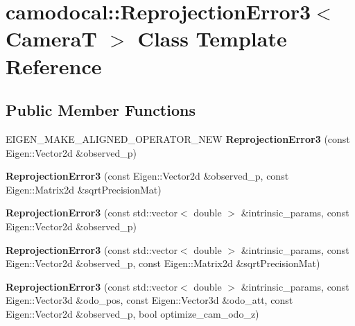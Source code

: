 \hypertarget{classcamodocal_1_1ReprojectionError3}{}\section{camodocal\+:\+:Reprojection\+Error3$<$ CameraT $>$ Class Template Reference}
\label{classcamodocal_1_1ReprojectionError3}
\subsection*{Public Member Functions}
\begin{DoxyCompactItemize}
\item 
\mbox{\label{classcamodocal_1_1ReprojectionError3_aa5f0d2d2552de6d15fa8464f7b82504e}} 
E\+I\+G\+E\+N\+\_\+\+M\+A\+K\+E\+\_\+\+A\+L\+I\+G\+N\+E\+D\+\_\+\+O\+P\+E\+R\+A\+T\+O\+R\+\_\+\+N\+EW {\bfseries Reprojection\+Error3} (const Eigen\+::\+Vector2d \&observed\+\_\+p)
\item 
\mbox{\label{classcamodocal_1_1ReprojectionError3_a6a6cfba224d6ffe08eb9c0e10a98b9b7}} 
{\bfseries Reprojection\+Error3} (const Eigen\+::\+Vector2d \&observed\+\_\+p, const Eigen\+::\+Matrix2d \&sqrt\+Precision\+Mat)
\item 
\mbox{\label{classcamodocal_1_1ReprojectionError3_ab1d8c265911e32f3625ba66edee9fe7b}} 
{\bfseries Reprojection\+Error3} (const std\+::vector$<$ double $>$ \&intrinsic\+\_\+params, const Eigen\+::\+Vector2d \&observed\+\_\+p)
\item 
\mbox{\label{classcamodocal_1_1ReprojectionError3_ad193918239d0167d9754d003d9fef868}} 
{\bfseries Reprojection\+Error3} (const std\+::vector$<$ double $>$ \&intrinsic\+\_\+params, const Eigen\+::\+Vector2d \&observed\+\_\+p, const Eigen\+::\+Matrix2d \&sqrt\+Precision\+Mat)
\item 
\mbox{\label{classcamodocal_1_1ReprojectionError3_a6c76345d2c4793fdaa863f5e5121d298}} 
{\bfseries Reprojection\+Error3} (const std\+::vector$<$ double $>$ \&intrinsic\+\_\+params, const Eigen\+::\+Vector3d \&odo\+\_\+pos, const Eigen\+::\+Vector3d \&odo\+\_\+att, const Eigen\+::\+Vector2d \&observed\+\_\+p, bool optimize\+\_\+cam\+\_\+odo\+\_\+z)

\end{DoxyCompactItemize}
